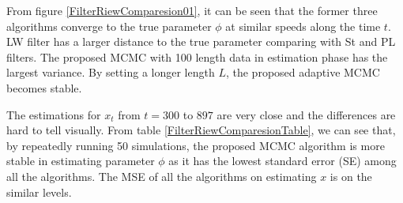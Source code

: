 

From figure \ref{FilterRiewComparesion01}, it can be seen that the former three algorithms converge to the true parameter $\phi$ at similar speeds along the time $t$. LW filter has a larger distance to the true parameter comparing with St and PL filters. The proposed MCMC with 100 length data in estimation phase has the largest variance. By setting a longer length $L$, the proposed adaptive MCMC becomes stable. 

The estimations for $x_t$ from $t=300$ to $897$ are very close and the differences are hard to tell visually. From table \ref{FilterRiewComparesionTable}, we can see that, by repeatedly running 50 simulations, the proposed MCMC algorithm is more stable in estimating parameter $\phi$ as it has the lowest standard error (SE) among all the algorithms. The MSE of all the algorithms on estimating $x$ is on the similar levels. 


